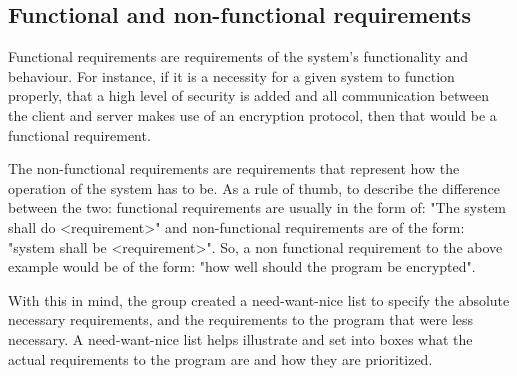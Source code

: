 \subsection{Functional and non-functional requirements}

Functional requirements are requirements of the system's functionality and behaviour. For
instance, if it is a necessity for a given system to function properly, that a high level of
security is added and all communication between the client and server makes use of an
encryption protocol, then that would be a functional requirement\cite{SEF01}.

The non-functional requirements are requirements that represent how the operation of the
system has to be. 
As a rule of thumb, to describe the difference between the two: functional requirements are
usually in the form of: "The system shall do <requirement>" and non-functional requirements
are of the form: "system shall be <requirement>". So, a non functional requirement to the
above example would be of the form: "how well should the program be encrypted".

With this in mind, the group created a need-want-nice list to specify the absolute necessary
requirements, and the requirements to the program that were less necessary. A need-want-nice
list helps illustrate and set into boxes what the actual requirements to the program are and
how they are prioritized.





